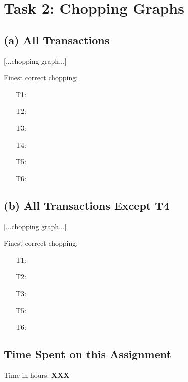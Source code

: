 \documentclass[11pt]{scrartcl}
\begin{document}
\section*{Task 2: Chopping Graphs}

\subsection*{(a) All Transactions}

\medskip

[...chopping graph...]

\medskip

\noindent Finest correct chopping:
\begin{enumerate}
\item[T1:]
\item[T2:]
\item[T3:] 
\item[T4:]
\item[T5:]
\item[T6:] 
\end{enumerate}


\subsection*{(b) All Transactions Except T4}

\medskip

[...chopping graph...]

\medskip

\noindent Finest correct chopping:
\begin{enumerate}
\item[T1:]
\item[T2:]
\item[T3:] 
\item[T5:]
\item[T6:] 
\end{enumerate}


\subsection*{Time Spent on this Assignment}

Time in hours: {\bf XXX}


\end{document}
